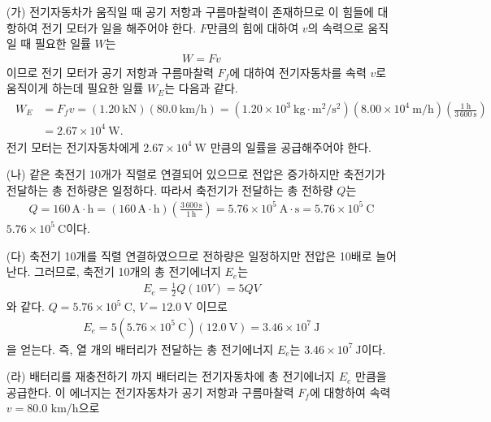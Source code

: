 \documentclass[tightenlines,floatfix,nofootinbib,superscriptaddress,fleqn]{revtex4-2}
\begin{document}
\begin{itemize}
  \item[(가)] 전기자동차가 움직일 때 공기 저항과 구름마찰력이 존재하므로 이 힘들에 대항하여
  전기 모터가 일을 해주어야 한다. $F$만큼의 힘에 대하여 $v$의 속력으로 움직일 때 필요한
  일률 $W$는
  \begin{align}
    W = Fv
  \end{align}
  이므로 전기 모터가 공기 저항과 구름마찰력 $F_f$에 대하여 전기자동차를 속력 $v$로 움직이게
  하는데 필요한 일률 $W_E$는 다음과 같다.
  \begin{align}
    \begin{split}
      W_E &= F_fv = (1.20~\mathrm{kN})(80.0~\mathrm{km/h})
      =(1.20\times 10^3~\mathrm{kg\cdot m^2/s^2})(8.00\times 10^4~\mathrm{m/h})
      \left(\frac{1~\mathrm{h}}{3\,600~\mathrm{s}}\right) \\
      &=2.67\times 10^4~\mathrm{W}.
    \end{split}
  \end{align}
  전기 모터는 전기자동차에게 $2.67\times 10^4~\mathrm{W}$ 만큼의 일률을 공급해주어야 한다.
  \item[(나)]
  같은 축전기 10개가 직렬로 연결되어 있으므로 전압은 증가하지만 축전기가 전달하는 
  총 전하량은 일정하다. 따라서 축전기가 전달하는 총 전하량 $Q$는
  \begin{align}
    Q = 160\,\mathrm{A\cdot h} = (160\,\mathrm{A\cdot h})
    \left(\frac{3\,600\,\mathrm{s}}{1\,\mathrm{h}}\right)
    =5.76\times 10^{5}~\mathrm{A\cdot s} 
    =5.76\times 10^{5}~\mathrm{C} 
  \end{align}
  $5.76\times 10^{5}~\mathrm{C}$이다.
  \item[(다)]
  축전기 10개를 직렬 연결하였으므로 전하량은 일정하지만 전압은 10배로 늘어난다.
  그러므로, 축전기 10개의 총 전기에너지 $E_e$는
  \begin{align}
    E_e = \frac{1}{2}Q(10V) = 5QV
  \end{align}
  와 같다. 
  $Q = 5.76\times 10^{5}~\mathrm{C}$, $V = 12.0~\mathrm{V}$ 이므로
  \begin{align}
    E_e = 5(5.76\times 10^{5}~\mathrm{C})(12.0~\mathrm{V})
    = 3.46\times 10^7~\mathrm{J}
  \end{align}
  을 얻는다. 즉, 열 개의 배터리가 전달하는 총 전기에너지 $E_e$는 
  $3.46\times 10^7~\mathrm{J}$이다.
  \item[(라)]
  배터리를 재충전하기 까지 배터리는 전기자동차에 총 전기에너지 $E_e$ 만큼을 공급한다.
  이 에너지는 전기자동차가 공기 저항과 구름마찰력 $F_f$에 대항하여 속력 $v = $80.0 km/h으로

\end{itemize}
\end{document}
